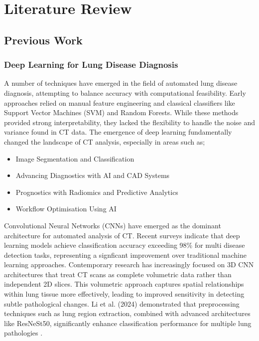 \chapter{Literature Review}

\section{Previous Work}

\subsection{Deep Learning for Lung Disease Diagnosis}
A number of techniques have emerged in the field of automated lung disease diagnosis, attempting to balance accuracy with computational
feasibility. Early approaches relied on manual feature engineering and classical classifiers like Support Vector Machines (SVM) and Random Forests.\cite{al2024deep}
While these methods provided strong interpretability, they lacked the flexibility to handle the noise and variance found in CT data\cite{rai2025explainable}.
The emergence of deep learning fundamentally changed the landscape of \ac{CT} analysis, especially in areas such as\cite{singh20203ddeeplearningmedical};

\begin{itemize}
    \item Image Segmentation and Classification
    \item Advancing Diagnostics with AI and CAD Systems
    \item Prognostics with Radiomics and Predictive Analytics
    \item Workflow Optimisation Using AI
\end{itemize}

Convolutional Neural Networks (CNNs) have emerged as the dominant architecture for automated analysis of \ac{CT}\cite{litjens2017survey}.
Recent surveys indicate that deep learning models achieve classification accuracy exceeding 98\% for multi disease detection tasks\cite{liu2022deep},
representing a signficant improvement over traditional machine learning approaches.
Contemporary research has increasingly focused on 3D CNN architectures that treat CT scans as complete volumetric data rather than independent
2D slices. This volumetric approach captures spatial relationships within lung tissue more effectively, leading to improved sensitivity in
detecting subtle pathological changes. Li et al. (2024)\cite{li2023multi} demonstrated that preprocessing techniques such as lung region extraction, combined
with advanced architectures like ResNeSt50, significantly enhance classification performance for multiple lung pathologies \cite{wang2024resnest}.

